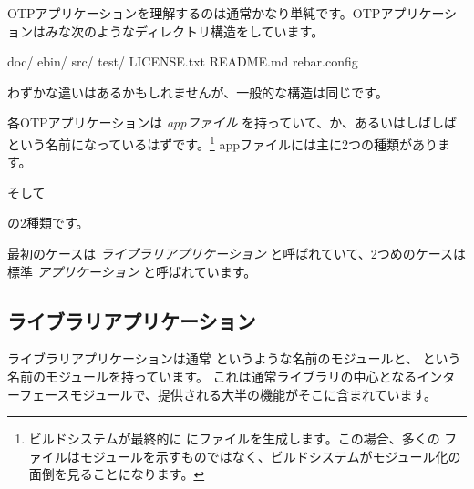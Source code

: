 OTPアプリケーションを理解するのは通常かなり単純です。OTPアプリケーションはみな次のようなディレクトリ構造をしています。

\begin{VerbatimRaw}
doc/
ebin/
src/
test/
LICENSE.txt
README.md
rebar.config
\end{VerbatimRaw}

わずかな違いはあるかもしれませんが、一般的な構造は同じです。

各OTPアプリケーションは \emph{appファイル} を持っていて、か、あるいはしばしば  という名前になっているはずです。\footnote{ビルドシステムが最終的に  にファイルを生成します。この場合、多くの  ファイルはモジュールを示すものではなく、ビルドシステムがモジュール化の面倒を見ることになります。}
appファイルには主に2つの種類があります。


そして


の2種類です。

最初のケースは \emph{ライブラリアプリケーション} と呼ばれていて、2つめのケースは標準 \emph{アプリケーション} と呼ばれています。

\subsection{ライブラリアプリケーション}
\label{subsec:dive-library-applications}

ライブラリアプリケーションは通常  というような名前のモジュールと、  という名前のモジュールを持っています。
これは通常ライブラリの中心となるインターフェースモジュールで、提供される大半の機能がそこに含まれています。

